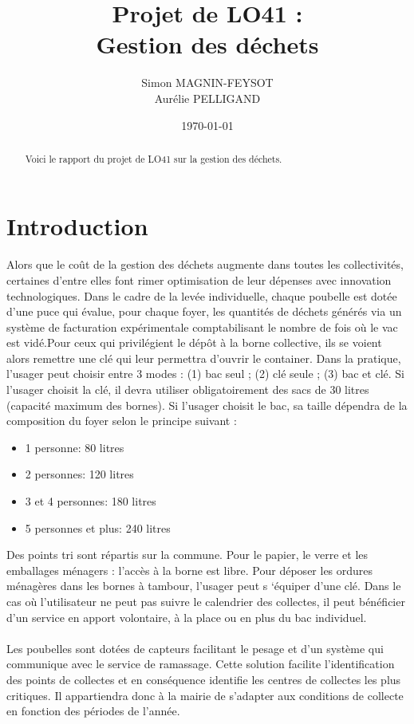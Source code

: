\documentclass[12pt]{article}
\title{\textbf{Projet de LO41 : \\Gestion des déchets}}
\author{Simon MAGNIN-FEYSOT\\
		Aurélie PELLIGAND}
\date{\today}
\begin{document}
\maketitle
\begin{abstract}
Voici le rapport du projet de LO41 sur la gestion des déchets.
\end{abstract}


\section{Introduction}
\paragraph{}Alors que le coût de la gestion des déchets augmente dans toutes les collectivités, certaines d'entre elles font rimer optimisation de leur dépenses avec innovation technologiques. Dans le cadre de la levée individuelle, chaque poubelle est dotée d'une puce qui évalue, pour chaque foyer, les quantités de déchets générés via un système de facturation expérimentale comptabilisant le nombre de fois où le vac est vidé.Pour ceux qui privilégient le dépôt à la borne collective, ils se voient alors remettre une clé qui leur permettra d'ouvrir le container. Dans la pratique, l’usager peut choisir entre 3 modes : (1) bac seul ; (2) clé seule ; (3) bac et clé. Si l’usager choisit la clé, il devra utiliser obligatoirement des sacs de 30 litres (capacité maximum des bornes). Si l’usager choisit le bac, sa taille dépendra de la composition du foyer selon le principe suivant :
\begin{itemize}
\item 1 personne: 80 litres
\item 2 personnes: 120 litres
\item 3 et 4 personnes: 180 litres
\item 5 personnes et plus: 240 litres
\end{itemize}
Des points tri sont répartis sur la commune. Pour le papier, le verre et les emballages ménagers : l’accès à la borne est libre. Pour déposer les ordures ménagères dans les bornes à tambour, l’usager peut s ‘équiper d’une clé. Dans le cas où l’utilisateur ne peut pas suivre le calendrier des collectes, il peut bénéficier d’un service en apport volontaire, à la place ou en plus du bac individuel. 

\paragraph{}Les poubelles sont dotées de capteurs facilitant le pesage et d’un système qui communique avec le service de ramassage. Cette solution facilite l’identification des points de collectes et en conséquence identifie les centres de collectes les plus critiques. Il appartiendra donc à la mairie de s’adapter aux conditions de collecte en fonction des périodes de l’année.
\end{document}
